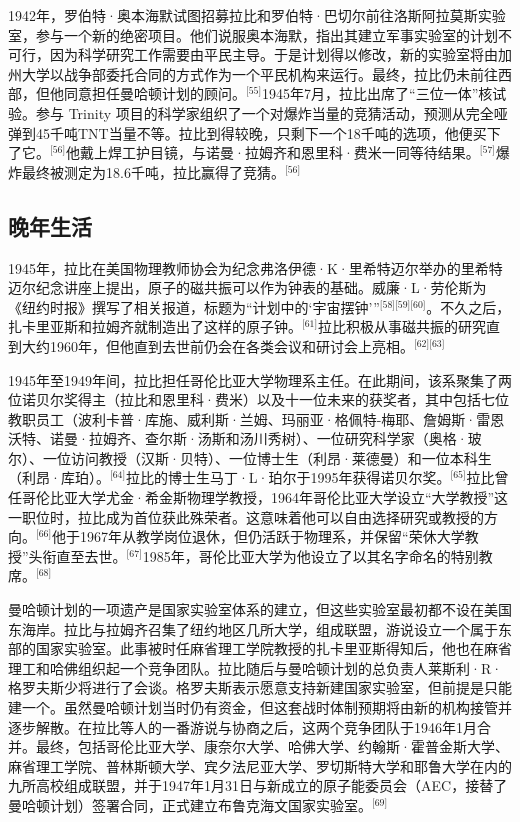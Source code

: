 1942年，罗伯特·奥本海默试图招募拉比和罗伯特·巴切尔前往洛斯阿拉莫斯实验室，参与一个新的绝密项目。他们说服奥本海默，指出其建立军事实验室的计划不可行，因为科学研究工作需要由平民主导。于是计划得以修改，新的实验室将由加州大学以战争部委托合同的方式作为一个平民机构来运行。最终，拉比仍未前往西部，但他同意担任曼哈顿计划的顾问。\(^\text{[55]}\)1945年7月，拉比出席了“三位一体”核试验。参与 Trinity 项目的科学家组织了一个对爆炸当量的竞猜活动，预测从完全哑弹到45千吨TNT当量不等。拉比到得较晚，只剩下一个18千吨的选项，他便买下了它。\(^\text{[56]}\)他戴上焊工护目镜，与诺曼·拉姆齐和恩里科·费米一同等待结果。\(^\text{[57]}\)爆炸最终被测定为18.6千吨，拉比赢得了竞猜。\(^\text{[56]}\)
\subsection{晚年生活}
1945年，拉比在美国物理教师协会为纪念弗洛伊德·K·里希特迈尔举办的里希特迈尔纪念讲座上提出，原子的磁共振可以作为钟表的基础。威廉·L·劳伦斯为《纽约时报》撰写了相关报道，标题为“计划中的‘宇宙摆钟’”\(^\text{[58][59][60]}\)。不久之后，扎卡里亚斯和拉姆齐就制造出了这样的原子钟。\(^\text{[61]}\)拉比积极从事磁共振的研究直到大约1960年，但他直到去世前仍会在各类会议和研讨会上亮相。\(^\text{[62][63]}\)

1945年至1949年间，拉比担任哥伦比亚大学物理系主任。在此期间，该系聚集了两位诺贝尔奖得主（拉比和恩里科·费米）以及十一位未来的获奖者，其中包括七位教职员工（波利卡普·库施、威利斯·兰姆、玛丽亚·格佩特-梅耶、詹姆斯·雷恩沃特、诺曼·拉姆齐、查尔斯·汤斯和汤川秀树）、一位研究科学家（奥格·玻尔）、一位访问教授（汉斯·贝特）、一位博士生（利昂·莱德曼）和一位本科生（利昂·库珀）。\(^\text{[64]}\)拉比的博士生马丁·L·珀尔于1995年获得诺贝尔奖。\(^\text{[65]}\)拉比曾任哥伦比亚大学尤金·希金斯物理学教授，1964年哥伦比亚大学设立“大学教授”这一职位时，拉比成为首位获此殊荣者。这意味着他可以自由选择研究或教授的方向。\(^\text{[66]}\)他于1967年从教学岗位退休，但仍活跃于物理系，并保留“荣休大学教授”头衔直至去世。\(^\text{[67]}\)1985年，哥伦比亚大学为他设立了以其名字命名的特别教席。\(^\text{[68]}\)

曼哈顿计划的一项遗产是国家实验室体系的建立，但这些实验室最初都不设在美国东海岸。拉比与拉姆齐召集了纽约地区几所大学，组成联盟，游说设立一个属于东部的国家实验室。此事被时任麻省理工学院教授的扎卡里亚斯得知后，他也在麻省理工和哈佛组织起一个竞争团队。拉比随后与曼哈顿计划的总负责人莱斯利·R·格罗夫斯少将进行了会谈。格罗夫斯表示愿意支持新建国家实验室，但前提是只能建一个。虽然曼哈顿计划当时仍有资金，但这套战时体制预期将由新的机构接管并逐步解散。在拉比等人的一番游说与协商之后，这两个竞争团队于1946年1月合并。最终，包括哥伦比亚大学、康奈尔大学、哈佛大学、约翰斯·霍普金斯大学、麻省理工学院、普林斯顿大学、宾夕法尼亚大学、罗切斯特大学和耶鲁大学在内的九所高校组成联盟，并于1947年1月31日与新成立的原子能委员会（AEC，接替了曼哈顿计划）签署合同，正式建立布鲁克海文国家实验室。\(^\text{[69]}\)


